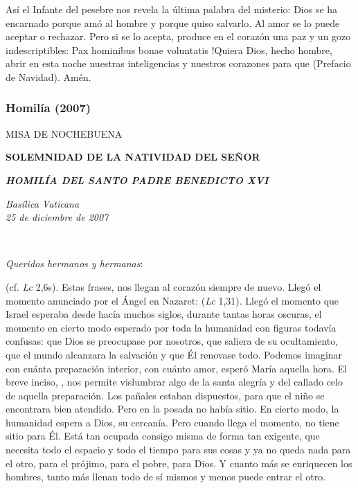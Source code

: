 Así el Infante del pesebre nos revela la última palabra del misterio: Dios se ha encarnado porque amó al hombre y porque quiso salvarlo. Al amor se lo puede aceptar o rechazar. Pero si se lo acepta, produce en el corazón una paz y un gozo indescriptibles: Pax hominibus bonae voluntatis !Quiera Dios, hecho hombre, abrir en esta noche nuestras inteligencias y nuestros corazones para que  (Prefacio de Navidad). Amén.

\subsubsection{Homilía (2007)}

MISA DE NOCHEBUENA

\textbf{SOLEMNIDAD DE LA NATIVIDAD DEL SEÑOR}

\textbf{\emph{HOMILÍA DEL SANTO PADRE BENEDICTO XVI}}

\emph{Basílica Vaticana\\ 25 de diciembre de 2007}

~

\emph{Queridos hermanos y hermanas}:

 (cf. \emph{Lc} 2,6s). Estas frases, nos llegan al corazón siempre de nuevo. Llegó el momento anunciado por el Ángel en Nazaret:  (\emph{Lc} 1,31). Llegó el momento que Israel esperaba desde hacía muchos siglos, durante tantas horas oscuras, el momento en cierto modo esperado por toda la humanidad con figuras todavía confusas: que Dios se preocupase por nosotros, que saliera de su ocultamiento, que el mundo alcanzara la salvación y que Él renovase todo. Podemos imaginar con cuánta preparación interior, con cuánto amor, esperó María aquella hora. El breve inciso, , nos permite vislumbrar algo de la santa alegría y del callado celo de aquella preparación. Los pañales estaban dispuestos, para que el niño se encontrara bien atendido. Pero en la posada no había sitio. En cierto modo, la humanidad espera a Dios, su cercanía. Pero cuando llega el momento, no tiene sitio para Él. Está tan ocupada consigo misma de forma tan exigente, que necesita todo el espacio y todo el tiempo para sus cosas y ya no queda nada para el otro, para el prójimo, para el pobre, para Dios. Y cuanto más se enriquecen los hombres, tanto más llenan todo de sí mismos y menos puede entrar el otro.

